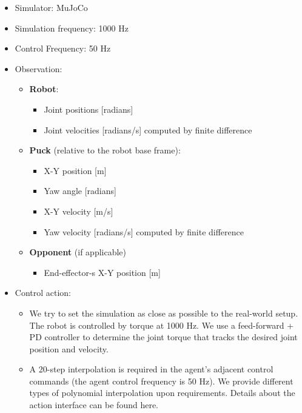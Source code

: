     \begin{itemize}
        \item Simulator: MuJoCo \cite{MuJoCo}
        \item Simulation frequency: 1000 Hz
        \item Control Frequency: 50 Hz
        \item Observation:
            \begin{itemize}
                \item \textbf{Robot}:
                \begin{itemize}
                    \item Joint positions [radians]
                    \item Joint velocities [radians/s] computed by finite difference
                \end{itemize}
                \item \textbf{Puck} (relative to the robot base frame):
                    \begin{itemize}
                        \item X-Y position [m]
                        \item Yaw angle [radians]
                        \item X-Y velocity [m/s]
                        \item Yaw velocity [radians/s] computed by finite difference
                    \end{itemize}
                \item \textbf{Opponent} (if applicable)
                \begin{itemize}
                    \item End-effector-s X-Y position [m]
                \end{itemize}
            \end{itemize}
        \item Control action:
            \begin{itemize}
                \item We try to set the simulation as close as possible to the real-world setup. The robot is controlled by torque at 1000 Hz. We use a feed-forward + PD controller to determine the joint torque that tracks the desired joint position and velocity.
                \item A 20-step interpolation is required in the agent's adjacent control commands (the agent control frequency is 50 Hz). We provide different types of polynomial interpolation upon requirements. Details about the action interface can be found here.
            \end{itemize}
    \end{itemize}

